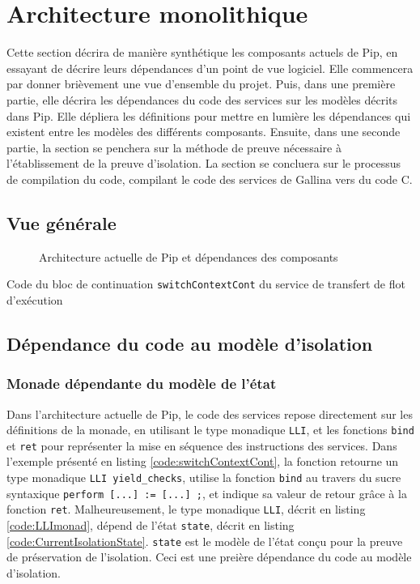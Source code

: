 	\section{Architecture monolithique}

		Cette section décrira de manière synthétique les composants actuels de Pip, en essayant de décrire leurs dépendances d'un point de vue logiciel. Elle commencera par donner brièvement une vue d'ensemble du projet. Puis, dans une première partie, elle décrira les dépendances du code des services sur les modèles décrits dans Pip. Elle dépliera les définitions pour mettre en lumière les dépendances qui existent entre les modèles des différents composants. Ensuite, dans une seconde partie, la section se penchera sur la méthode de preuve nécessaire à l'établissement de la preuve d'isolation. La section se concluera sur le processus de compilation du code, compilant le code des services de Gallina vers du code C.
		
		\subsection{Vue générale}

			\begin{figure}[!ht]
				
				\caption{Architecture actuelle de Pip et dépendances des composants}
				\label{fig:switchContextCont}
			\end{figure}
			\begin{listing}[!ht]
				\caption{Code du bloc de continuation \texttt{switchContextCont} du service de transfert de flot d'exécution}
				\label{code:switchContextCont}
			\end{listing}

		\subsection{Dépendance du code au modèle d'isolation}

			\subsubsection{Monade dépendante du modèle de l'état}

			Dans l'architecture actuelle de Pip, le code des services repose directement sur les définitions de la monade, en utilisant le type monadique \texttt{LLI}, et les fonctions \texttt{bind} et \texttt{ret} pour représenter la mise en séquence des instructions des services. Dans l'exemple présenté en listing \ref{code:switchContextCont}, la fonction retourne un type monadique \texttt{LLI yield\_checks}, utilise la fonction \texttt{bind} au travers du sucre syntaxique \texttt{perform [...] := [...] ;}, et indique sa valeur de retour grâce à la fonction \texttt{ret}.
			Malheureusement, le type monadique \texttt{LLI}, décrit en listing \ref{code:LLImonad}, dépend de l'état \texttt{state}, décrit en listing \ref{code:CurrentIsolationState}. \texttt{state} est le modèle de l'état conçu pour la preuve de préservation de l'isolation. Ceci est une preière dépendance du code au modèle d'isolation.

